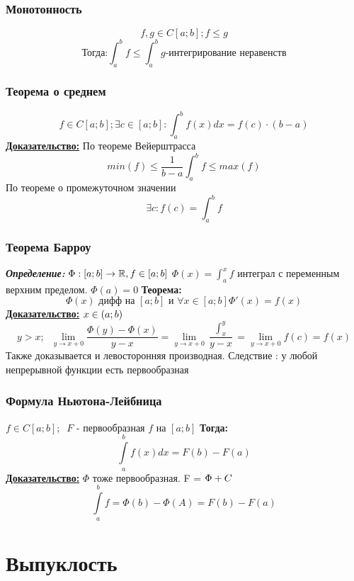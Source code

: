 \documentclass[12pt, a4paper]{article}
\newcommand{\nl}{\newline}
\newcommand{\intba}{\int^b_a}
\newcommand{\proof}{\textbf{\underline{Доказательство:}} }
\newcommand{\then}{\textbf{Тогда:}}
\newcommand{\definition}{\textbf{\textit{Определение:}}}
\begin{document}
	\subsubsection{Монотонность} 
	$$ f, g \in C[a; b]; f \leqslant g $$
	$$ \then \int^b_a f \leqslant \int^b_a g \text{-интегрирование неравенств}$$
	
	\subsubsection{Теорема о среднем}
	$$ f \in C[a;b]; \exists c \in [a;b] : \int^b_a f(x)dx = f(c) \cdot (b-a) $$
	\proof \nl
	По теореме Вейерштрасса $$ min(f) \leqslant \frac{1}{b-a}\intba f \leqslant max(f)  $$
	По теореме о промежуточном значении $$ \exists c : f(c) = \intba f $$
	
	\subsubsection{Теорема Барроу}
	\definition \nl
	$\Phi : [a;b] \rightarrow \mathbb{R}, f \in [a;b] \nl$
	$\Phi(x) = \int_a^x f$ интеграл с переменным верхним пределом. \nl
	$\Phi(a) = 0$ \nl
	\textbf{Теорема:} 
	$$ \Phi(x) \text{ дифф на } [a; b] \text{ и } \forall x \in [a; b] \Phi'(x) = f(x)$$
	\proof \nl
	$x \in (a; b) \nl$
	$$ y>x;\;\; \lim_{y \to x+0} \frac{\Phi(y)-\Phi(x)}{y-x} = \lim_{y \to x+0}\frac{\int^y_x}{y-x} = \lim_{y \to x+0} f(c) = f(x) $$
	Также доказывается и левосторонняя производная. \nl
	Следствие : у любой непрерывной функции есть первообразная
	
	\subsubsection{Формула Ньютона-Лейбница}
	$f \in C[a; b];\;\; F$ - первообразная $f$ на $[a; b]$\nl
	\then $$\int\limits^b_a f(x)dx = F(b)-F(a) $$
	\proof \nl
	$\Phi$ тоже первообразная. F = $\Phi + C\nl$
	$$ \int\limits^b_a f = \Phi(b)-\Phi(A) = F(b)-F(a) $$
	
	
	
	
	
	\section{Выпуклость}
	
\end{document}
